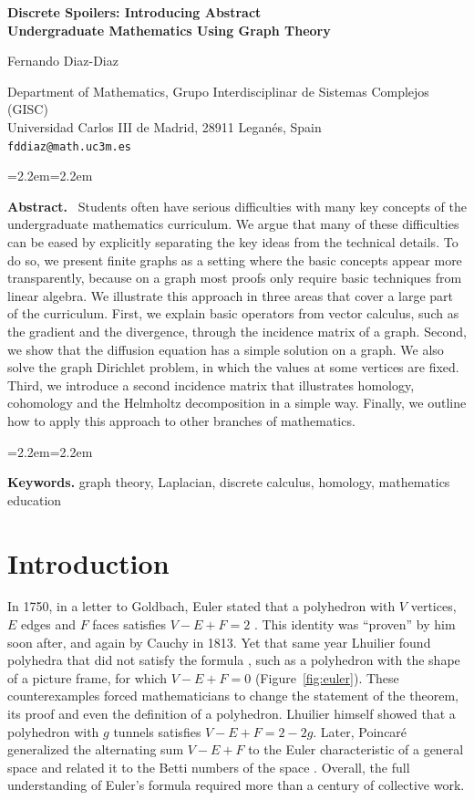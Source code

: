 \documentclass[11pt,a4paper]{article}
\makeatletter
\renewcommand{\maketitle}{%
  \begin{center}
    {\LARGE\bfseries Discrete Spoilers: Introducing Abstract\\[3pt] Undergraduate Mathematics Using Graph Theory\par}
    \vspace{1.2em}
    {\large Fernando Diaz-Diaz\par}
    \vspace{0.4em}
    {\small Department of Mathematics, Grupo Interdisciplinar de Sistemas Complejos (GISC)\\
    Universidad Carlos III de Madrid, 28911 Legan\'es, Spain\\
    \texttt{fddiaz@math.uc3m.es}\par}
  \end{center}
  \vspace{1em}}
\renewenvironment{abstract}{%
  \begin{list}{}{\leftmargin=2.2em\rightmargin=2.2em}\item\relax\small
  {\bfseries Abstract.}\ }{\end{list}}
\theoremstyle{plain}
\theoremstyle{definition}
\makeatother
\begin{document}
\maketitle

\begin{abstract}
Students often have serious difficulties with many key concepts of the undergraduate mathematics curriculum. We argue that many of these difficulties can be eased by explicitly separating the key ideas from the technical details. To do so, we present finite graphs as a setting where the basic concepts appear more transparently, because on a graph most proofs only require basic techniques from linear algebra. We illustrate this approach in three areas that cover a large part of the curriculum. First, we explain basic operators from vector calculus, such as the gradient and the divergence, through the incidence matrix of a graph. Second, we show that the diffusion equation has a simple solution on a graph. We also solve the graph Dirichlet problem, in which the values at some vertices are fixed. Third, we introduce a second incidence matrix that illustrates homology, cohomology and the Helmholtz decomposition in a simple way. Finally, we outline how to apply this approach to other branches of mathematics.
\end{abstract}

\vspace{4px}

\begin{list}{}{\leftmargin=2.2em\rightmargin=2.2em}\item\relax\small{\bfseries Keywords.} graph theory, Laplacian, discrete calculus, homology, mathematics education\end{list}

\vspace{4px}

\section{Introduction}

In 1750, in a letter to Goldbach, Euler stated that a polyhedron with $V$ vertices, $E$ edges and $F$ faces satisfies $V-E+F=2$ \cite{richeson2008}. This identity was ``proven'' by him soon after, and again by Cauchy in 1813. Yet that same year Lhuilier found polyhedra that did not satisfy the formula \cite{lhuilier1813}, such as a polyhedron with the shape of a picture frame, for which $V-E+F=0$ (Figure~\ref{fig:euler}). These counterexamples forced mathematicians to change the statement of the theorem, its proof and even the definition of a polyhedron. Lhuilier himself showed that a polyhedron with $g$ tunnels satisfies $V-E+F=2-2g$. Later, Poincar\'e generalized the alternating sum $V-E+F$ to the Euler characteristic of a general space and related it to the Betti numbers of the space \cite{richeson2008}. Overall, the full understanding of Euler's formula required more than a century of collective work.
\end{document}
